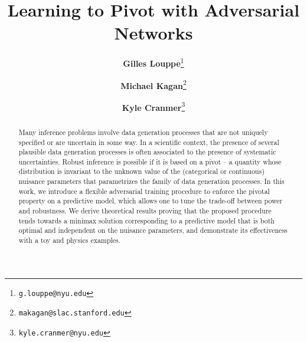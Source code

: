 \documentclass[twocolumn,superscriptaddress,aps]{revtex4-1}
\theoremstyle{plain}
\begin{document}

\title{\Large{Learning to Pivot with Adversarial Networks}}
\vspace{1cm}
\author{\small{\bf Gilles Louppe}\thanks{\texttt{g.louppe@nyu.edu}}}
\author{\small{\bf Michael Kagan}\thanks{\texttt{makagan@slac.stanford.edu}}}
\author{\small{\bf Kyle Cranmer}\thanks{\texttt{kyle.cranmer@nyu.edu}}}

\begin{abstract}

Many inference problems involve data generation processes that are not uniquely
specified or are uncertain in some way. In a scientific context, the presence of
several plausible data generation processes is often associated to the presence
of systematic uncertainties. Robust inference is possible if it is based on a
pivot -- a quantity whose distribution is invariant to the unknown value of the
(categorical or continuous)
nuisance parameters that parametrizes the family of data generation processes. In
this work, we introduce a flexible adversarial training procedure to enforce the pivotal
property on a predictive model, which allows one to tune the trade-off between
power and robustness. We derive theoretical
results proving that the proposed procedure tends towards a minimax solution corresponding to a predictive model
that is both optimal and independent on the nuisance parameters, and demonstrate
its effectiveness  with a toy and physics examples.


\end{abstract}
\end{document}
